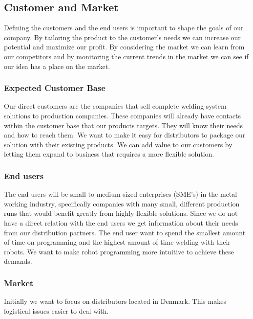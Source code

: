 \subsection{Customer and Market}

Defining the customers and the end users is important to shape the goals of our company. 
By tailoring the product to the customer's needs we can increase our potential and maximize our profit. 
By considering the market we can learn from our competitors and by monitoring the current trends in the market we can see if our idea has a place on the market. 

\subsubsection{Expected Customer Base}
Our direct customers are the companies that sell complete welding system solutions to production companies. 
These companies will already have contacts within the customer base that our products targets.
They will know their needs and how to reach them. 
We want to make it easy for distributors to package our solution with their existing products.
We can add value to our customers by letting them expand to business that requires a more flexible solution.

\subsubsection{End users}
The end users will be small to medium sized enterprises (SME's) in the metal working industry, specifically companies with many small, different production runs that would benefit greatly from highly flexible solutions.
Since we do not have a direct relation with the end users we get information about their needs from our distribution partners.
The end user want to spend the smallest amount of time on programming and the highest amount of time welding with their robots.
We want to make robot programming more intuitive to achieve these demands.

\subsubsection{Market}
Initially we want to focus on distributors located in Denmark.
This makes logistical issues easier to deal with.


